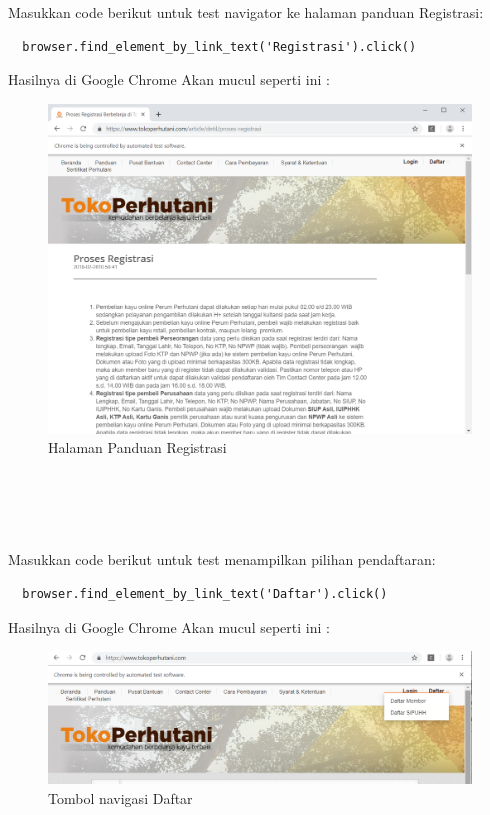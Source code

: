 Masukkan code berikut untuk test navigator ke halaman panduan Registrasi:
\begin{verbatim}
  browser.find_element_by_link_text('Registrasi').click()
\end{verbatim}

Hasilnya  di Google Chrome Akan mucul seperti ini :
\begin{figure}[h]
\centering
\includegraphics[scale=0.3]{figures/1pdregis.PNG}
\caption{Halaman Panduan Registrasi}
\end{figure}
\\\\\\\\

Masukkan code berikut untuk test menampilkan pilihan pendaftaran:
\begin{verbatim}
  browser.find_element_by_link_text('Daftar').click()
\end{verbatim}

Hasilnya  di Google Chrome Akan mucul seperti ini :
\begin{figure}[h]
\centering
\includegraphics[scale=0.3]{figures/2daftar.PNG}
\caption{Tombol navigasi Daftar}
\end{figure}
\\

